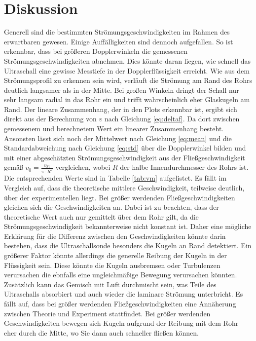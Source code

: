 \section{Diskussion}
Generell sind die bestimmten Strömungsgeschwindigkeiten im Rahmen des erwartbaren gewesen. Einige Auffälligkeiten sind dennoch aufgefallen.
So ist erkennbar, dass bei größeren Dopplerwinkeln die gemessenen Strömungsgeschwindigkeiten abnehmen. Dies könnte daran liegen, wie schnell das Ultraschall 
eine gewisse Messtiefe in der Dopplerflüssigkeit erreicht. Wie aus dem Strömungsprofil zu erkennen sein wird, verläuft die Strömung am Rand des Rohrs deutlich langsamer als in der Mitte.
Bei großen Winkeln dringt der Schall nur sehr langsam radial in das Rohr ein und trifft wahrscheinlich eher Glaskugeln am Rand.
Der lineare Zusammenhang, der in den Plots erkennbar ist, ergibt sich direkt aus der Berechnung von $v$ nach Gleichung \eqref{eq:deltaf}. Da dort zwischen gemessenem und
berechnetem Wert ein linearer Zusammenhang besteht.
Ansonsten lässt sich noch der Mittelwert nach Gleichung \eqref{eq:mean} und die Standardabweichung nach Gleichung \eqref{eq:std} über die Dopplerwinkel bilden und mit einer abgeschätzten Strömungsgeschwindigkeit aus 
der Fließgeschwindigkeit gemäß $v_0=\frac{v_{\text{Fl}}}{\pi \cdot R^2}$ vergleichen, wobei $R$ der halbe Innendurchmesser des Rohrs ist.
Die entsprechenden Werte sind in Tabelle \ref{tab:vm} aufgelistet. Es fällt im Vergleich auf, dass die theoretische mittlere Geschwindigkeit, teilweise deutlich, über der experimentellen liegt.
Bei größer werdenden Fließgeschwindigkeiten gleichen sich die Geschwindigkeiten an. Dabei ist zu beachten, dass der theoretische Wert auch nur gemittelt über dem Rohr gilt, da die Strömungsgeschwindigkeit bekannterweise
nicht konstant ist. Daher eine mögliche Erklärung für die Differenz zwischen den Geschwindigkeiten könnte darin bestehen, dass die Ultraschallsonde besonders die Kugeln an Rand detektiert. Ein größerer Faktor könnte allerdings die
generelle Reibung der Kugeln in der Flüssigkeit sein. Diese könnte die Kugeln ausbremsen oder Turbulenzen verursachen die ebnfalls eine ungleichmäßige Bewegung verursachen könnten.
Zusätzlich kann das Gemisch mit Luft durchmischt sein, was Teile des Ultraschalls absorbiert und auch wieder die laminare Strömung unterbricht.
Es fällt auf, dass bei größer werdenden Fließgeschwindigkeiten eine Annäherung zwischen Theorie und Experiment stattfindet. Bei größer werdenden
Geschwindigkeiten bewegen sich Kugeln aufgrund der Reibung mit dem Rohr eher durch die Mitte, wo Sie dann auch schneller fließen können.
